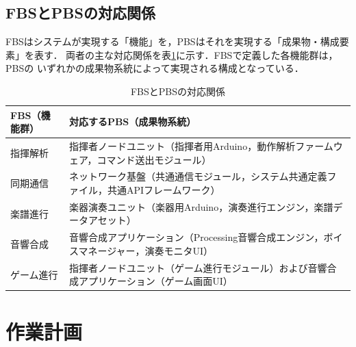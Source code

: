 \documentclass[lualatex,book,paper=a4paper,jafontsize=11.5pt,jafontscale=1.05]{jlreq}
\begin{document}
\subsection{FBSとPBSの対応関係}
FBSはシステムが実現する「機能」を，PBSはそれを実現する「成果物・構成要素」を表す．
両者の主な対応関係を表\ref{tab:fbs-pbs}に示す．FBSで定義した各機能群は，PBSの
いずれかの成果物系統によって実現される構成となっている．
\begin{table}[H]\centering
  \caption{FBSとPBSの対応関係}\label{tab:fbs-pbs}
  \small
  \begin{tabularx}{\linewidth}{>{\raggedright\arraybackslash}p{3.2cm} X}
    \toprule
    FBS（機能群） & 対応するPBS（成果物系統） \\
    \midrule
    指揮解析 & 指揮者ノードユニット（指揮者用Arduino，動作解析ファームウェア，コマンド送出モジュール） \\
    同期通信 & ネットワーク基盤（共通通信モジュール，システム共通定義ファイル，共通APIフレームワーク） \\
    楽譜進行 & 楽器演奏ユニット（楽器用Arduino，演奏進行エンジン，楽譜データアセット） \\
    音響合成 & 音響合成アプリケーション（Processing音響合成エンジン，ボイスマネージャー，演奏モニタUI） \\
    ゲーム進行 & 指揮者ノードユニット（ゲーム進行モジュール）および音響合成アプリケーション（ゲーム画面UI） \\
    \bottomrule
  \end{tabularx}
\end{table}

\section{作業計画}\label{sec:workplan}
\end{document}
